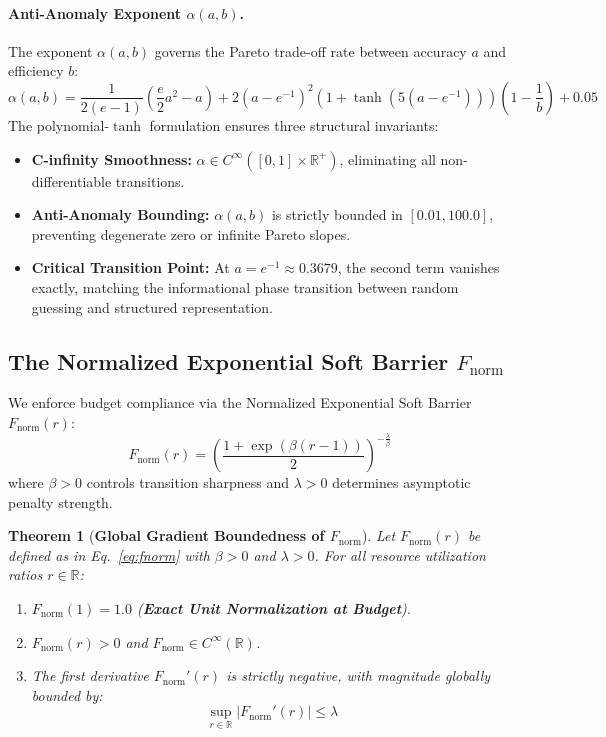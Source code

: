 \documentclass[11pt, a4paper]{article}
\newtheorem{theorem}{Theorem}
\begin{document}
\paragraph{Anti-Anomaly Exponent $\alpha(a, b)$.}
The exponent $\alpha(a, b)$ governs the Pareto trade-off rate between accuracy $a$ and efficiency $b$:
\begin{equation}
    \alpha(a, b) = \frac{1}{2(e - 1)} \left(\frac{e}{2} a^2 - a\right) + 2(a - e^{-1})^2 \left(1 + \tanh(5(a - e^{-1}))\right) \left(1 - \frac{1}{b}\right) + 0.05
    \label{eq:alpha}
\end{equation}
The polynomial-$\tanh$ formulation ensures three structural invariants:
\begin{itemize}
    \item \textbf{C-infinity Smoothness:} $\alpha \in C^\infty([0, 1] \times \mathbb{R}^+)$, eliminating all non-differentiable transitions.
    \item \textbf{Anti-Anomaly Bounding:} $\alpha(a, b)$ is strictly bounded in $[0.01, 100.0]$, preventing degenerate zero or infinite Pareto slopes.
    \item \textbf{Critical Transition Point:} At $a = e^{-1} \approx 0.3679$, the second term vanishes exactly, matching the informational phase transition between random guessing and structured representation.
\end{itemize}

\subsection{The Normalized Exponential Soft Barrier $F_{\text{norm}}$}
\label{sec:fnorm}

We enforce budget compliance via the Normalized Exponential Soft Barrier $F_{\text{norm}}(r)$:
\begin{equation}
    F_{\text{norm}}(r) = \left(\frac{1 + \exp(\beta(r - 1))}{2}\right)^{-\frac{\lambda}{\beta}}
    \label{eq:fnorm}
\end{equation}
where $\beta > 0$ controls transition sharpness and $\lambda > 0$ determines asymptotic penalty strength.

\begin{theorem}[\textbf{Global Gradient Boundedness of $F_{\text{norm}}$}]
\label{thm:fnorm}
Let $F_{\text{norm}}(r)$ be defined as in Eq.~\eqref{eq:fnorm} with $\beta > 0$ and $\lambda > 0$. For all resource utilization ratios $r \in \mathbb{R}$:
\begin{enumerate}
    \item $F_{\text{norm}}(1) = 1.0$ (\textbf{Exact Unit Normalization at Budget}).
    \item $F_{\text{norm}}(r) > 0$ and $F_{\text{norm}} \in C^\infty(\mathbb{R})$.
    \item The first derivative $F_{\text{norm}}'(r)$ is strictly negative, with magnitude globally bounded by:
    \begin{equation}
        \sup_{r \in \mathbb{R}} |F_{\text{norm}}'(r)| \le \lambda
    \end{equation}
\end{enumerate}
\end{theorem}
\end{document}
